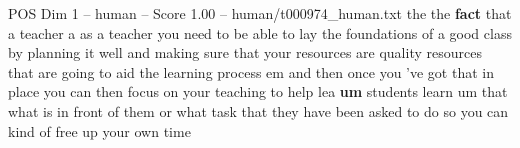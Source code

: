 \begin{textsample}{POS Dim 1 – human – Score 1.00 – human/t000974\_human.txt}  \label{ex:f1_pos_003}
the the \textbf{fact} that a teacher a as a teacher you need to be able to lay the foundations of a good class by planning it well and making sure that your resources are quality resources that are going to aid the learning process em and then once you 've got that in place you can then focus on your teaching to help lea \textbf{um} students learn um that what is in front of them or what task that they have been asked to do so you can kind of free up your own time

\end{textsample}
